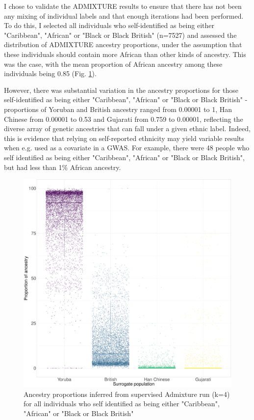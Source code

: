 I chose to validate the ADMIXTURE results to ensure that there has not been any mixing of individual labels and that enough iterations had been performed. To do this, I selected all individuals who self-identified as being either "Caribbean", "African" or "Black or Black British" (n=7527) and assessed the distribution of ADMIXTURE ancestry proportions, under the assumption that these individuals should contain more African than other kinds of ancestry. This was the case, with the mean proportion of African ancestry among these individuals being 0.85 (Fig. \ref{fig:African_Inds_proportions_ADMIXTURE}).

However, there was substantial variation in the ancestry proportions for those self-identified as being either "Caribbean", "African" or "Black or Black British" - proportions of Yoruban and British ancestry ranged from 0.00001 to 1, Han Chinese from 0.00001 to 0.53 and Gujarati from 0.759 to 0.00001, reflecting the diverse array of genetic ancestries that can fall under a given ethnic label. Indeed, this is evidence that relying on self-reported ethnicity may yield variable results when e.g. used as a covariate in a GWAS. For example, there were 48 people who self identified as being either "Caribbean", "African" or "Black or Black British", but had less than 1\% African ancestry.

\begin{figure}[htp]
    \centering
    \includegraphics[width=1.0\textwidth]{../images/chapter3/African_Inds_proportions.pdf}
    \caption{Ancestry proportions inferred from supervised Admixture run (k=4) for all individuals who self identified as being either "Caribbean", "African" or "Black or Black British"}
    \label{fig:African_Inds_proportions_ADMIXTURE}
\end{figure}

